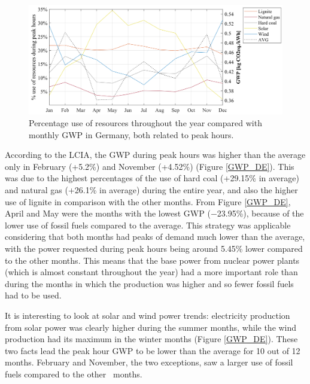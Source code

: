{{\begin{figure}[htbp]
	\centering
	\includegraphics[width=1\textwidth]{ChapterLCA/Images/GWP_plots/COMP_GWP_DE.png}
	\caption{Percentage use of resources throughout the year compared with monthly GWP in Germany, both related to peak hours.}
	\label{COMP_GE}
\end{figure}

\newpage
According to the LCIA, the GWP during peak hours was higher than the average only in  February {(+5.2\%)} and November {(+4.52\%)} (Figure \ref{GWP_DE}). This was due to the highest percentages of the use of hard coal {(+29.15\% in average)} and natural gas {(+26.1\% in average)} during the entire year, and also the higher use of lignite in comparison with the other months. From Figure \ref{GWP_DE}, April and May were the months with the lowest GWP {($-$23.95\%)}, because of the lower use of fossil fuels compared to the average. This strategy was applicable considering that both months had peaks of demand much lower than the average, {with the power requested during peak hours being around 5.45\% lower compared to the other months}. This means that the base power from nuclear power plants (which is almost constant throughout the year) had a more important role than during the months in which the production was higher and so fewer fossil fuels had to be used. 

It is interesting to look at solar and wind power trends: electricity production from solar power was clearly higher during the summer months, while the wind production had its maximum in the winter months (Figure \ref{GWP_DE}). These two facts lead the peak hour GWP to be lower than the average  for 10 out of 12 months. February and November, the two exceptions, saw a larger use of fossil fuels compared to the {other}%
~months. 


}}
